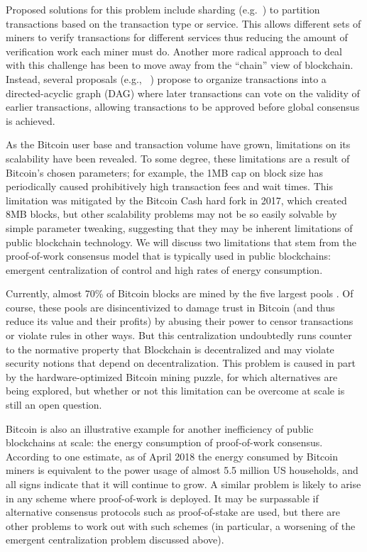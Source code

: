 Proposed solutions for this problem include sharding (e.g.~\cite{CCS:LNZBGS16, FC:GenRenSir17}) to partition transactions based on the transaction type or service.
This allows different sets of miners to verify transactions for different services thus reducing the amount of verification work each miner must do.  Another more radical approach to deal with this challenge has been to move away from the ``chain'' view of blockchain.  Instead, several proposals (e.g., ~\cite{ePrint:SomLewZoh16,eprint:SomZoh18,IOTA}) propose to organize transactions into a directed-acyclic graph (DAG) where later transactions can vote on the validity of earlier transactions, allowing transactions to be approved before global consensus is achieved.

As the Bitcoin user base and transaction volume have grown, limitations on its scalability have been revealed. To some degree, these limitations are a result of Bitcoin's chosen parameters; for example, the 1MB cap on block size has periodically caused prohibitively high transaction fees and wait times. This limitation was mitigated by the Bitcoin Cash hard fork in 2017, which created 8MB blocks, but other scalability problems may not be so easily solvable by simple parameter tweaking, suggesting that they may be inherent limitations of public blockchain technology. We will discuss two limitations that stem from the proof-of-work consensus model that is typically used in public blockchains: emergent centralization of control and high rates of energy consumption.

Currently, almost 70\% of Bitcoin blocks are mined by the five largest pools \cite{BlockchainInfoPools}. Of course, these pools are disincentivized to damage trust in Bitcoin (and thus reduce its value and their profits) by abusing their power to censor transactions or violate rules in other ways. But this centralization undoubtedly runs counter to the normative property that Blockchain is decentralized and may violate security notions that depend on decentralization. This problem is caused in part by the hardware-optimized Bitcoin mining puzzle, for which alternatives are being explored, but whether or not this limitation can be overcome at scale is still an open question.

Bitcoin is also an illustrative example for another inefficiency of public blockchains at scale: the energy consumption of proof-of-work consensus. According to one estimate\cite{Digiconomist}, as of April 2018 the energy consumed by Bitcoin miners is equivalent to the power usage of almost 5.5 million US households, and all signs indicate that it will continue to grow. A similar problem is likely to arise in any scheme where proof-of-work is deployed. It may be surpassable if alternative consensus protocols such as proof-of-stake are used, but there are other problems to work out with such schemes (in particular, a worsening of the emergent centralization problem discussed above). 

